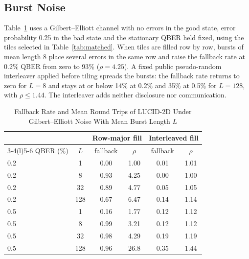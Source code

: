 \documentclass[conference]{IEEEtran}
\begin{document}
\subsection{Burst Noise}\label{sec:burst}
Table~\ref{tab:burst} uses a Gilbert--Elliott channel \cite{gilbert1960,elliott1963} with no errors in the good state, error probability 0.25 in the bad state and the stationary QBER held fixed, using the tiles selected in Table~\ref{tab:matched}. When tiles are filled row by row, bursts of mean length 8 place several errors in the same row and raise the fallback rate at 0.2\% QBER from zero to 93\% ($\rho=4.25$). A fixed public pseudo-random interleaver applied before tiling spreads the bursts: the fallback rate returns to zero for $L=8$ and stays at or below 14\% at 0.2\% and 35\% at 0.5\% for $L=128$, with $\rho\le1.44$. The interleaver adds neither disclosure nor communication.

\begin{table}[t]
\caption{Fallback Rate and Mean Round Trips of LUCID-2D Under Gilbert--Elliott Noise With Mean Burst Length $L$}
\label{tab:burst}
\centering
\setlength{\tabcolsep}{4pt}
\begin{tabular}{@{}lccccc@{}}
\toprule
& & \multicolumn{2}{c}{Row-major fill} & \multicolumn{2}{c}{Interleaved fill}\\
\cmidrule(lr){3-4}\cmidrule(l){5-6}
QBER (\%) & $L$ & fallback & $\rho$ & fallback & $\rho$\\
\midrule
0.2 & 1 & 0.00 & 1.00 & 0.01 & 1.01 \\
0.2 & 8 & 0.93 & 4.25 & 0.00 & 1.00 \\
0.2 & 32 & 0.89 & 4.77 & 0.05 & 1.05 \\
0.2 & 128 & 0.67 & 6.47 & 0.14 & 1.14 \\
0.5 & 1 & 0.16 & 1.77 & 0.12 & 1.12 \\
0.5 & 8 & 0.99 & 3.21 & 0.12 & 1.12 \\
0.5 & 32 & 0.98 & 4.29 & 0.19 & 1.19 \\
0.5 & 128 & 0.96 & 26.8 & 0.35 & 1.44 \\
\bottomrule
\end{tabular}
\end{table}
\end{document}
